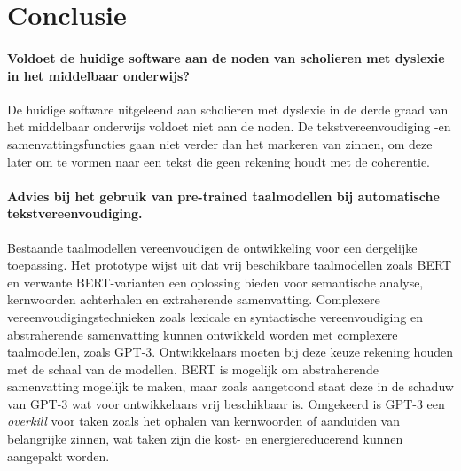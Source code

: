 
\chapter{Conclusie}%
\label{ch:conclusie}









\subsubsection{Voldoet de huidige software aan de noden van scholieren met dyslexie in het middelbaar onderwijs?}

De huidige software uitgeleend aan scholieren met dyslexie in de derde graad van het middelbaar onderwijs voldoet niet aan de noden. De tekstvereenvoudiging -en samenvattingsfuncties gaan niet verder dan het markeren van zinnen, om deze later om te vormen naar een tekst die geen rekening houdt met de coherentie.

\subsubsection{Advies bij het gebruik van pre-trained taalmodellen bij automatische tekstvereenvoudiging.}

Bestaande taalmodellen vereenvoudigen de ontwikkeling voor een dergelijke toepassing. Het prototype wijst uit dat vrij beschikbare taalmodellen zoals BERT en verwante BERT-varianten een oplossing bieden voor semantische analyse, kernwoorden achterhalen en extraherende samenvatting. Complexere vereenvoudigingstechnieken zoals lexicale en syntactische vereenvoudiging en abstraherende samenvatting kunnen ontwikkeld worden met complexere taalmodellen, zoals GPT-3. Ontwikkelaars moeten bij deze keuze rekening houden met de schaal van de modellen. BERT is mogelijk om abstraherende samenvatting mogelijk te maken, maar zoals aangetoond staat deze in de schaduw van GPT-3 wat voor ontwikkelaars vrij beschikbaar is. Omgekeerd is GPT-3 een \textit{overkill} voor taken zoals het ophalen van kernwoorden of aanduiden van belangrijke zinnen, wat taken zijn die kost- en energiereducerend kunnen aangepakt worden.

